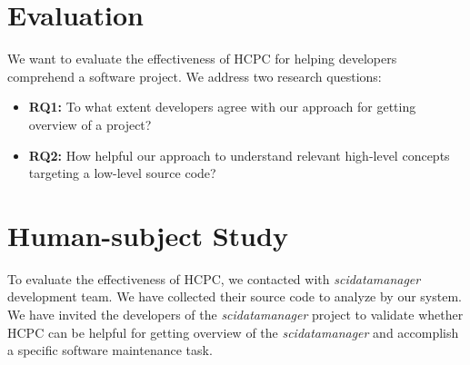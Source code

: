 \section{Evaluation}
We want to evaluate the effectiveness of HCPC for helping developers comprehend a software project. We address two research questions:
\begin{itemize}
    \item \textbf{RQ1:} To what extent developers agree with our approach for getting overview of a project?
    \item \textbf{RQ2:} How helpful our approach to understand relevant high-level concepts targeting a low-level source code?
\end{itemize}

\section{Human-subject Study}
To evaluate the effectiveness of HCPC, we contacted with \emph{scidatamanager} development team. We have collected their source code to analyze by our system. We have invited the developers of the \emph{scidatamanager} project to validate whether HCPC can be helpful for getting overview of the \emph{scidatamanager} and accomplish a specific software maintenance task.
